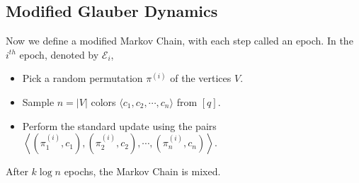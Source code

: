 \subsection{Modified Glauber Dynamics}%
\label{sub:modified_glauber_dynamics}

Now we define a modified Markov Chain, with each step called an epoch.
In the $i^{th}$ epoch, denoted by $\mathcal E_i$,
\begin{itemize}
    \item Pick a random permutation $\pi^{(i)}$ of the vertices $V$.
    \item Sample $n = |V|$ colors $ \langle c_1, c_2,\cdots, c_n \rangle$ from $[q]$.
    \item Perform the standard update using the pairs
          $\left\langle (\pi^{(i)}_1, c_1), (\pi^{(i)}_2, c_2), \cdots, (\pi^{(i)}_n, c_n)\right\rangle$.
\end{itemize}

\begin{theorem}
\label{thm:modified_mixing}
After $k\log n$ epochs, the Markov Chain is mixed.
\end{theorem}
